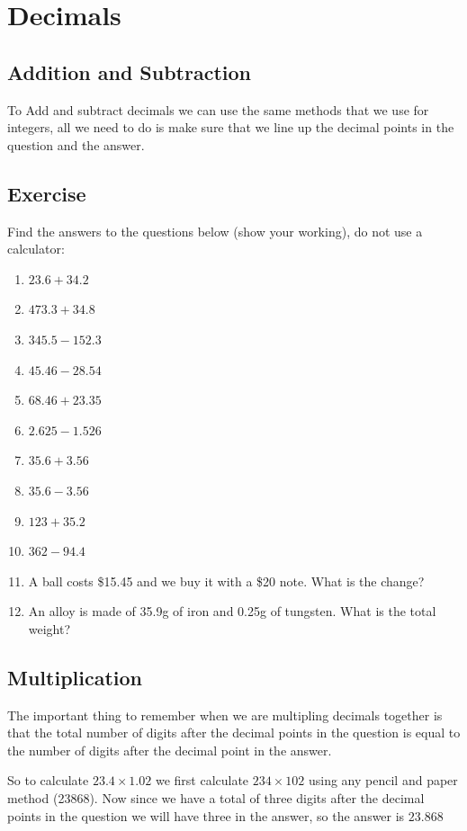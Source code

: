 \section{Decimals}
\subsection{Addition and Subtraction}
To Add and subtract decimals we can use the same methods that we use for integers, all we need to do is make sure that we line up the decimal points in the question and the answer.
\subsection{Exercise}

Find the answers to the questions below (show your working), do not use a calculator:
\begin{multicols}{2}
\begin{enumerate}
	\item $23.6 + 34.2$
	\item $473.3 + 34.8$
	\item $345.5 - 152.3$
	\item $45.46 - 28.54$
	\item $68.46 + 23.35$
	\item $2.625 - 1.526$
	\item $35.6 + 3.56$
	\item $35.6 - 3.56$
	\item $123 + 35.2$
	\item $362 - 94.4$
\end{enumerate}
\end{multicols}
\begin{enumerate}
\setcounter{enumi}{10}
	\item A ball costs \$15.45 and we buy it with a \$20 note.  What is the change?
	\item An alloy is made of 35.9g of iron and 0.25g of tungsten.  What is the total weight?
\end{enumerate}
\subsection{Multiplication}
The important thing to remember when we are multipling decimals together is that the total number of digits after the decimal points in the question is equal to the number of digits after the decimal point in the answer.

So to calculate $23.4 \times 1.02$ we first calculate $234 \times 102$ using any pencil and paper method (23868).  Now since we have a total of three digits after the decimal points in the question we will have three in the answer, so the answer is $23.868$

